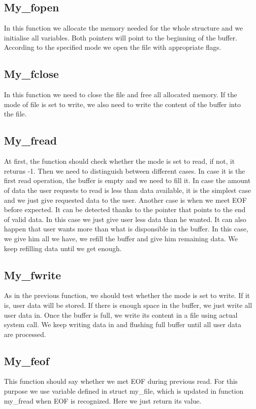 \documentclass[a4paper,10pt]{article}
\begin{document}
 \subsection{My\_fopen}
 In this function we allocate the memory needed for the whole structure and we initialise all variables. Both pointers will point to the beginning of the buffer. According to the specified mode we open the file with appropriate flags.
 \subsection{My\_fclose}
 In this function we need to close the file and free all allocated memory. If the mode of file is set to write, we also need to write the content of the buffer into the file.

 \subsection{My\_fread}
 At first, the function should check whether the mode is set to read, if not, it returns -1. Then we need to distinguish between different cases. In case it is the first read operation, the buffer is empty and we need to fill it. In case the amount of data the user requests to read is less than data available, it is the simplest case and we just give requested data to the user. Another case is when we meet EOF before expected. It can be detected thanks to the pointer that points to the end of valid data. In this case we just give user less data than he wanted. It can also happen that user wants more than what is disponsible in the buffer. In this case, we give him all we have, we refill the buffer and give him remaining data. We keep refilling data until we get enough.

 \subsection{My\_fwrite}
 As in the previous function, we should test whether the mode is set to write. If it is, user data will be stored. If there is enough space in the buffer, we just write all user data in. Once the buffer is full, we write its content in a file using actual system call. We keep writing data in and flushing full buffer until all user data are processed.

\subsection{My\_feof}
This function should say whether we met EOF during previous read. For this purpose we use variable defined in struct my\_file, which is updated in function my\_fread when EOF is recognized. Here we just return its value.
\end{document}
